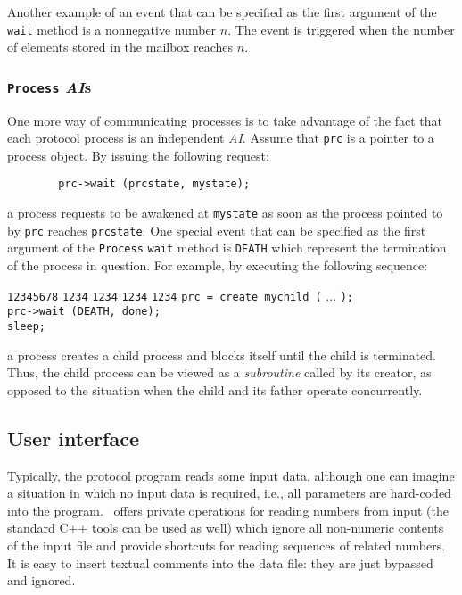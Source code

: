 Another example of an event that can be specified as the first argument of
the {\tt wait} method is a nonnegative number $n$.
The event is triggered when the number of elements stored in the mailbox reaches
$n$.

\subsubsection{{\tt Process} {\em AI\/}s}

One more way of communicating processes is to take advantage of the fact
that each protocol process is an independent {\em AI\/}.
Assume that {\tt prc} is a pointer to a process object.
By issuing the following request:
{\small
\begin{verbatim}
        prc->wait (prcstate, mystate);
\end{verbatim} }
\noindent
a process requests to be awakened at {\tt mystate} as soon as the
process pointed to by {\tt prc} reaches {\tt prcstate}.
One special event that can be specified as the first argument of the
{\tt Process} {\tt wait} method is {\tt DEATH} which represent the termination
of the process in question.
For example, by executing the following sequence:
{\small
\begin{tabbing}
{\tt 12345678} \= {\tt 1234} \= {\tt 1234} \= {\tt 1234} \= {\tt 1234} \kill
\> {\tt prc = create mychild (} ... {\tt );} \\
\> {\tt prc->wait (DEATH, done); } \\
\> {\tt sleep; }
\end{tabbing} }
\noindent
a process creates a child process and blocks itself until the child is
terminated.
Thus, the child process can be viewed as a {\em subroutine\/} called by its
creator, as opposed to the situation when the child and its father operate
concurrently.

\subsection{User interface}

Typically, the protocol program reads some input data, although one can
imagine a situation in which no input data is required, i.e.,
all parameters are hard-coded into the program.
\smurph\ offers private operations for reading numbers from input
(the standard C++ tools can be used as well) which ignore all non-numeric
contents of the input file and provide shortcuts for reading sequences of
related numbers.
It is easy to insert textual comments into the data file: they are
just bypassed and ignored.

